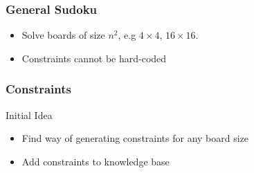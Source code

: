\documentclass{beamer}
\newcounter{row}
\newcounter{col}
\newcommand\setrow[9]{
    \setcounter{col}{1}
    \foreach \n in {#1, #2, #3, #4, #5, #6, #7, #8, #9} {
        \edef\x{\value{col} - 0.5}
        \edef\y{9.5 - \value{row}}
        \node[digit,name={\arabic{row}-\arabic{col}}] at (\x, \y) {\n};
        \stepcounter{col}
    }
    \stepcounter{row}
}
\begin{document}
\begin{frame}
  \frametitle{General Sudoku}
    \begin{itemize}
    \item Solve boards of size $n^2$, e.g $4 \times 4$, $16 \times 16$.
    \item Constraints cannot be hard-coded
    \end{itemize}
\end{frame}

\begin{frame}
  \frametitle{Constraints}
  \begin{block}{Initial Idea}
  \begin{itemize}
  \item Find way of generating constraints for any board size
  \item Add constraints to knowledge base 
  \end{itemize}    
  \end{block}

  \begin{figure}
    \centering
  \end{figure}
\end{frame}
\end{document}
